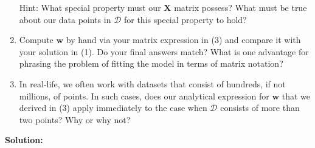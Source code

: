 \documentclass{harvardml}
\theoremstyle{definition}
\theoremstyle{plain}
\begin{document}
\begin{problem}
\begin{enumerate}
    Hint: What special property must our $\mathbf{X}$ matrix possess? What must be true about our data points in $\mathcal{D}$ for this special property to hold?
    \item Compute $\mathbf{w}$ by hand via your matrix expression in (3) and compare it with your solution in (1). Do your final answers match? What is one advantage for phrasing the problem of fitting the model in terms of matrix notation? 
    \item In real-life, we often work with datasets that consist of hundreds, if not millions, of points. In such cases, does our analytical expression for $\mathbf{w}$ that we derived in (3) apply immediately to the case when $\mathcal{D}$ consists of more than two points? Why or why not?
\end{enumerate}
    
\end{problem}
\pagebreak
\textbf{Solution:}\\
\end{document}
